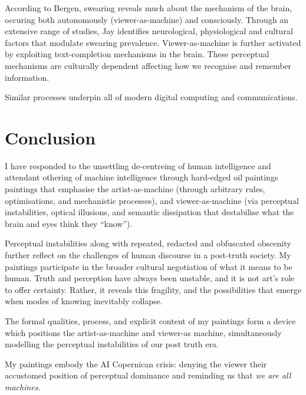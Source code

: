 \documentclass[12pt]{article}
\begin{document}
According to Bergen, swearing reveals much about the mechanism of the
brain, occuring both autonomously (viewer-as-machine) and
consciously.\cite{bergen2018what} Through an extensive range of
studies, Jay identifies neurological, physiological and cultural
factors that modulate swearing prevalence.\cite{jay1999why}
Viewer-as-machine is further activated by exploiting text-completion
mechanisms in the
brain.\cite{Taylor1953,Reicher1969,Healy1976,GraingerWhitney2004,CohenDehaene2000,Levy2008} These
perceptual mechanisms are culturally
dependent\cite{Bartlett1932,Hall1976,ChuaBolandNisbett2005,MasudaNisbett2001}
affecting how we recognise and remember information.

Similar processes underpin all of modern digital computing and
communications.\cite{shannon1948}

\section{Conclusion}
I have responded to the unsettling de-centreing of human intelligence
and attendant othering of machine intelligence through hard-edged oil
paintings paintings that emphasise the artist-as-machine (through
arbitrary rules, optimisations, and mechanistic processes), and
viewer-as-machine (via perceptual instabilities, optical illusions,
and semantic dissipation that destabilise what the brain and eyes
think they ``know''). 

Perceptual instabilities along with repeated, redacted and obfuscated
obscenity further reflect on the challenges of human discourse in a
post-truth society. My paintings participate in the broader cultural
negotiation of what it means to be human. Truth and perception have
always been unstable, and it is not art's role to offer
certainty. Rather, it reveals this fragility, and the possibilities
that emerge when modes of knowing inevitably collapse.

The formal qualities, process, and explicit content of my paintings
form a device which positions the artist-as-machine and viewer-as
machine, simultaneously modelling the perceptual instabilities of our
post truth era.

My paintings embody the AI Copernican crisis:
denying the viewer their accustomed position of perceptual dominance
and reminding us that \emph{we are all machines}.
\end{document}
